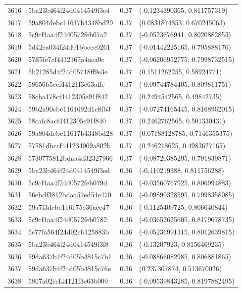 \begin{table}[ht]
\begin{tabular}{rlrl}
  3616 & 5ba23b464f24d0414549f3e4 & 0.37 & (-0.1234390365, 0.811757319) \\ 
  3617 & 59a804debc11617b4348bd29 & 0.37 & (0.0831874853, 0.670245063) \\ 
  3618 & 5c9cf4aa4f24d0572feb07a2 & 0.37 & (-0.0523676941, 0.8020882855) \\ 
  3619 & 5d42ea034f24d01bbccc0261 & 0.37 & (-0.01442225165, 0.795888176) \\ 
  3620 & 57ff5fe7cf4412167a4aea0c & 0.37 & (-0.06206952775, 0.7998732515) \\ 
  3621 & 5b21285d4f24d05718ff9e3e & 0.37 & (0.1511262255, 0.58924771) \\ 
  3622 & 58656b5ecf44121f3e63affe & 0.37 & (-0.09744784405, 0.809811751) \\ 
  3623 & 58cba178cf4412305e91f842 & 0.37 & (0.2494542565, 0.49842735) \\ 
  3624 & 59b2a90cbc1161692d1c8fb3 & 0.37 & (-0.07274165445, 0.8168962015) \\ 
  3625 & 58cafc8acf4412305e91f840 & 0.37 & (0.2462762565, 0.501330431) \\ 
  3626 & 59a804debc11617b4348bd28 & 0.37 & (0.07188128785, 0.7146355375) \\ 
  3627 & 57581dbccf441234909a802b & 0.37 & (0.246218625, 0.4983627165) \\ 
  3628 & 5730775812bdaa4d32327966 & 0.37 & (-0.08720385295, 0.791839871) \\ 
  3629 & 5ba23b464f24d0414549f3ed & 0.36 & (-0.110219388, 0.811756288) \\ 
  3630 & 5c9cf4aa4f24d0572feb079d & 0.36 & (-0.03560767925, 0.806994883) \\ 
  3631 & 56ebdf3812bdaa57ed54e470 & 0.36 & (-0.09890328595, 0.7998358085) \\ 
  3632 & 59a7f3dcbc116175e36ace47 & 0.36 & (-0.1125409725, 0.806640844) \\ 
  3633 & 5c9cf4aa4f24d0572feb0782 & 0.36 & (-0.03652625605, 0.8179078735) \\ 
  3634 & 5c77fa564f24d02cb125883b & 0.36 & (-0.05236991315, 0.8012639815) \\ 
  3635 & 5ba23b464f24d0414549f3f8 & 0.36 & (-0.13207923, 0.8156469235) \\ 
  3636 & 59da637b4f24d05b4815c7b1 & 0.36 & (-0.08866082985, 0.806881865) \\ 
  3637 & 59da637b4f24d05b4815c76e & 0.36 & (0.237307874, 0.513670026) \\ 
  3638 & 5867a02ccf44121f3e63b009 & 0.36 & (-0.09539843285, 0.8197882495) \\ 

\end{tabular}
\end{table}
